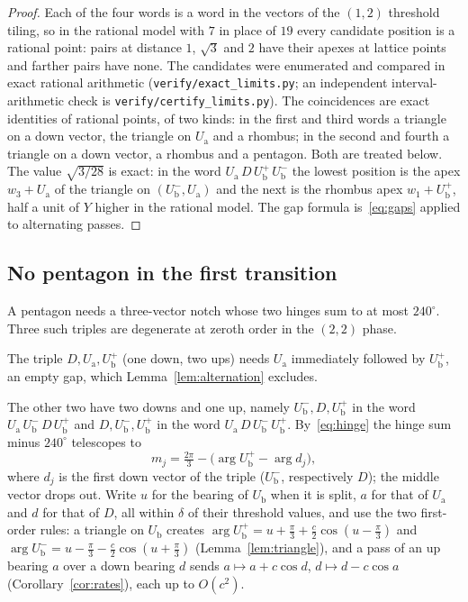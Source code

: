 \documentclass[11pt]{amsart}
\theoremstyle{definition}
\newcommand{\Ua}{U_{\mathrm a}}
\newcommand{\Ub}{U_{\mathrm b}}
\newcommand{\up}[1]{#1^{+}}
\newcommand{\dn}[1]{#1^{-}}
\begin{document}
\begin{proof}
Each of the four words is a word in the vectors of the $(1,2)$ threshold tiling, so in the rational
model with $7$ in place of $19$ every candidate position is a rational point: pairs at distance $1$, $\sqrt3$
and $2$ have their apexes at lattice points and farther pairs have none. The candidates were enumerated and
compared in exact rational arithmetic (\texttt{verify/exact\_limits.py}; an independent interval-arithmetic
check is \texttt{verify/certify\_limits.py}). The coincidences are exact identities of rational points, of two
kinds: in the first and third words a triangle on a down vector, the triangle on $\Ua$ and a rhombus; in the
second and fourth a triangle on a down vector, a rhombus and a pentagon. Both are treated below. The value $\sqrt{3/28}$ is exact: in the word $\Ua\,D\,\up{\Ub}\,\dn{\Ub}$
the lowest position is the apex $w_3+\Ua$ of the triangle on $(\dn{\Ub},\Ua)$ and the next is the
rhombus apex $w_1+\up{\Ub}$, half a unit of $Y$ higher in the rational model. The gap formula is~\eqref{eq:gaps} applied
to alternating passes.
\end{proof}

\subsection{No pentagon in the first transition} A pentagon needs a three-vector notch whose two hinges
sum to at most $240^\circ$. Three such triples are degenerate at zeroth order in the $(2,2)$ phase.

The triple $D,\Ua,\up{\Ub}$ (one down, two ups) needs $\Ua$ immediately followed by $\up{\Ub}$, an empty gap,
which Lemma~\ref{lem:alternation} excludes.

The other two have two downs and one up, namely $\dn{\Ub},D,\up{\Ub}$ in the word
$\Ua\,\dn{\Ub}\,D\,\up{\Ub}$ and $D,\dn{\Ub},\up{\Ub}$ in the word $\Ua\,D\,\dn{\Ub}\,\up{\Ub}$. By~\eqref{eq:hinge} the hinge sum minus
$240^\circ$ telescopes to
\[
m_j=\tfrac{2\pi}3-\bigl(\arg\up{\Ub}-\arg d_j\bigr),
\]
where $d_j$ is the first down vector of the triple ($\dn{\Ub}$, respectively $D$); the middle vector drops out.
Write $u$ for the bearing of $\Ub$ when it is split, $a$ for that of $\Ua$ and $d$ for that of $D$, all within
$\delta$ of their threshold values, and use the two first-order rules: a triangle on $\Ub$ creates
$\arg\up{\Ub}=u+\tfrac\pi3+\tfrac c2\cos(u-\tfrac\pi3)$ and $\arg\dn{\Ub}=u-\tfrac\pi3-\tfrac c2\cos(u+\tfrac\pi3)$
(Lemma~\ref{lem:triangle}), and a pass of an up bearing $a$ over a down bearing $d$ sends
$a\mapsto a+c\cos d$, $d\mapsto d-c\cos a$ (Corollary~\ref{cor:rates}), each up to $O(c^2)$.
\end{document}
